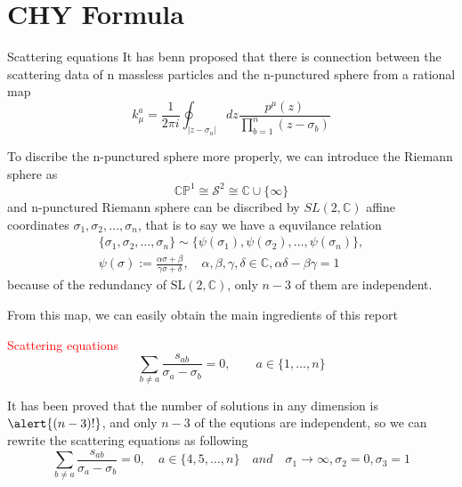 \documentclass{beamer}
\begin{document}
\section{CHY Formula}
\begin{frame}{Scattering equations}
    It has benn proposed that there is connection between the scattering data of n massless particles and the n-punctured sphere from a rational map
    \begin{equation*}
        k_\mu^a=\frac{1}{2\pi i}\oint_{|z-\sigma_a|}dz\frac{p^\mu(z)}{\prod ^n_{b=1}(z-\sigma_b)}
    \end{equation*}
 
    To discribe the n-punctured sphere more properly, we can introduce the Riemann sphere as
    \begin{equation*}
        \mathbb{CP}^1\cong \mathcal{S}^2\cong \mathbb{C}\cup\{\infty\}
    \end{equation*}
    and n-punctured Riemann sphere can be discribed by $SL(2,\mathbb{C})$ affine coordinates ${\sigma_1,\sigma_2,\ldots,\sigma_n}$, that is to say we have a equvilance relation
    \begin{align*}
        \{\sigma_1,\sigma_2,\ldots,\sigma_n\}\sim\{\psi(\sigma_1),\psi(\sigma_2),\ldots,\psi(\sigma_n)\},\\\psi(\sigma):=\frac{\alpha\sigma+\beta}{\gamma\sigma+\delta},\quad\alpha,\beta,\gamma,\delta\in\mathbb{C},\alpha\delta-\beta\gamma=1
    \end{align*}
    because of the redundancy of $\mathrm{SL}(2,\mathbb{C})$, only $n-3$ of them are independent.
\end{frame}
\begin{frame}
    From this map, we can easily obtain the main ingredients of this report \\
    

    \begin{block}{\textcolor{red}{Scattering equations}}
        \begin{equation*}
            \sum_{b\neq a } \frac{s_{ab}}{\sigma_a-\sigma_{b}}=0,\qquad a\in \{1,\dots,n\}
        \end{equation*}
    \end{block}
    It has been proved that the number of solutions in any dimension is $\alert{(n-3)!}$, and only \alert{$n-3$} of the equtions are independent, so we can rewrite the scattering equations as following 
    \begin{equation*}
        \sum_{b\neq a } \frac{s_{ab}}{\sigma_a-\sigma_{b}}=0,\quad a\in \{4,5,\dots,n\}\quad and\quad  \sigma_1\rightarrow\infty,\sigma_2=0,\sigma_3=1
    \end{equation*}
\end{frame}
\end{document}
